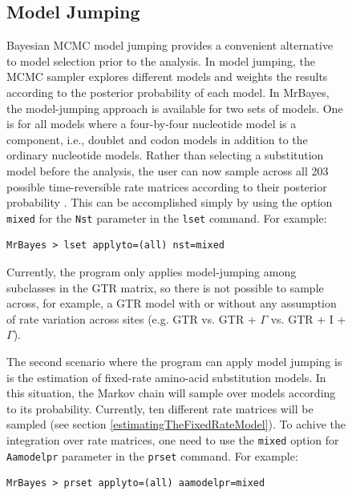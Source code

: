 \documentclass[12pt]{book}
\newcommand{\ttt}[1]{\texttt{#1}}
\begin{document}
\begin{figure}[h]
\subsection{Model Jumping}
\label{modelJumping}

Bayesian MCMC model jumping provides a convenient alternative to model selection prior to the
analysis. In model jumping, the MCMC sampler explores different models and weights the results
according to the posterior probability of each model. In MrBayes, the model-jumping approach is
available for two sets of models. One is for all models where a four-by-four nucleotide model is a
component, i.e., doublet and codon models in addition to the ordinary nucleotide models. Rather
than selecting a substitution model before the analysis, the user can now sample across all 203
possible time-reversible rate matrices according to their posterior probability
\citep{huelsenbeck04d}. This can be accomplished simply by using the option \ttt{mixed} for the
\ttt{Nst} parameter in the \ttt{lset} command. For example:

\small
\begin{singlespacing}
\begin{verbatim}
MrBayes > lset applyto=(all) nst=mixed
\end{verbatim}
\end{singlespacing}
\normalsize

Currently, the program only applies model-jumping among subclasses in the GTR matrix, so there
is not possible to sample across, for example, a GTR model with or without any assumption of rate
variation across sites (e.g. GTR vs. GTR + $\Gamma$ vs. GTR + I + $\Gamma$).

The second scenario where the program can apply model jumping is is the estimation of fixed-rate
amino-acid substitution models. In this situation, the Markov chain will sample over models
according to its probability. Currently, ten different rate matrices will be sampled (see section
\ref{estimatingTheFixedRateModel}). To achive the integration over rate matrices, one need to use
the \ttt{mixed} option for \ttt{Aamodelpr} parameter in the \ttt{prset} command. For example:

\small
\begin{singlespacing}
\begin{verbatim}
MrBayes > prset applyto=(all) aamodelpr=mixed
\end{verbatim}
\end{singlespacing}
\normalsize


\end{figure}
\end{document}
